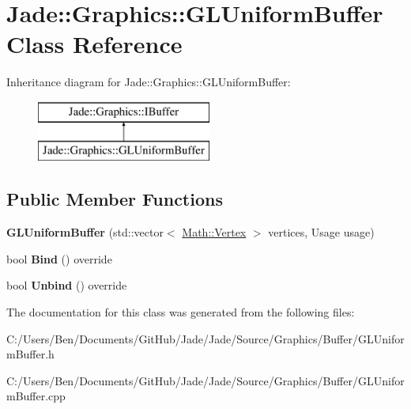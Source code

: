 \hypertarget{class_jade_1_1_graphics_1_1_g_l_uniform_buffer}{}\section{Jade\+:\+:Graphics\+:\+:G\+L\+Uniform\+Buffer Class Reference}
\label{class_jade_1_1_graphics_1_1_g_l_uniform_buffer}
Inheritance diagram for Jade\+:\+:Graphics\+:\+:G\+L\+Uniform\+Buffer\+:\begin{figure}[H]
\begin{center}
\leavevmode
\includegraphics[height=2.000000cm]{class_jade_1_1_graphics_1_1_g_l_uniform_buffer}
\end{center}
\end{figure}
\subsection*{Public Member Functions}
\begin{DoxyCompactItemize}
\item 
\hypertarget{class_jade_1_1_graphics_1_1_g_l_uniform_buffer_a6499428d70e503d9f6b9baceda221de5}{}{\bfseries G\+L\+Uniform\+Buffer} (std\+::vector$<$ \hyperlink{struct_jade_1_1_math_1_1_vertex}{Math\+::\+Vertex} $>$ vertices, Usage usage)\label{class_jade_1_1_graphics_1_1_g_l_uniform_buffer_a6499428d70e503d9f6b9baceda221de5}

\item 
\hypertarget{class_jade_1_1_graphics_1_1_g_l_uniform_buffer_afa2e98bdfee50c36b2f7fd7e49f2f15e}{}bool {\bfseries Bind} () override\label{class_jade_1_1_graphics_1_1_g_l_uniform_buffer_afa2e98bdfee50c36b2f7fd7e49f2f15e}

\item 
\hypertarget{class_jade_1_1_graphics_1_1_g_l_uniform_buffer_ac2b6de34107fc85e5c20649cbf26e0c1}{}bool {\bfseries Unbind} () override\label{class_jade_1_1_graphics_1_1_g_l_uniform_buffer_ac2b6de34107fc85e5c20649cbf26e0c1}

\end{DoxyCompactItemize}


The documentation for this class was generated from the following files\+:\begin{DoxyCompactItemize}
\item 
C\+:/\+Users/\+Ben/\+Documents/\+Git\+Hub/\+Jade/\+Jade/\+Source/\+Graphics/\+Buffer/G\+L\+Uniform\+Buffer.\+h\item 
C\+:/\+Users/\+Ben/\+Documents/\+Git\+Hub/\+Jade/\+Jade/\+Source/\+Graphics/\+Buffer/G\+L\+Uniform\+Buffer.\+cpp\end{DoxyCompactItemize}
